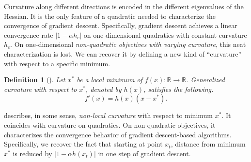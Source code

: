 \documentclass{article}
\newtheorem{definition}[theorem]{Definition}
\newcommand{\mat}[1]{\bm{\mathit{#1}}}
\begin{document}
Curvature along different directions is encoded in the different eigenvalues of the Hessian. 
It is the only feature of a quadratic needed to characterize the convergence of gradient descent. Specifically, gradient descent achieves a linear convergence rate $|1 - \alpha h_c|$ on one-dimensional quadratics with constant curvature $h_c$. 
On one-dimensional \emph{non-quadratic objectives with varying curvature}, this neat characterization is lost.
We can recover it by defining a new kind of ``curvature'' with respect to a specific minimum.

\begin{definition}[\Gc]
\label{def:generalized_curvature}
Let $x^*$ be a local minimum of $f(x):\mathbb{R}\rightarrow\mathbb{R}$.
Generalized curvature with respect to $x^*$, denoted by $h(x)$, satisfies the following.
\begin{equation}
	 f'(x) = h(x) (x - x^*). 
	\label{eqn:generalized_curvature}
\end{equation}
\end{definition}
\Gc describes, in some sense, \emph{non-local curvature} with respect to minimum $x^*$.
It coincides with curvature on quadratics.
On non-quadratic objectives, it characterizes the convergence behavior of gradient descent-based algorithms.
Specifically, we recover the fact that starting at point $x_t$, distance from minimum $x^*$ is reduced by $|1-\alpha h(x_t)|$ in one step of gradient descent.
\end{document}
